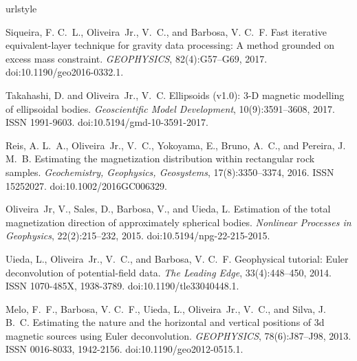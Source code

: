 
\nocite{*}

%
\begin{thebibliography}{9}
\providecommand{\natexlab}[1]{#1}
\expandafter\ifx\csname urlstyle\endcsname\relax
  \providecommand{\doi}[1]{doi:\discretionary{}{}{}#1}\else
  \providecommand{\doi}{doi:\discretionary{}{}{}\begingroup
  \urlstyle{rm}\Url}\fi

Siqueira, F. C.~L., Oliveira~Jr., V.~C., and Barbosa, V. C.~F.
\newblock Fast iterative equivalent-layer technique for gravity data
  processing: {A} method grounded on excess mass constraint.
\newblock \emph{GEOPHYSICS}, 82(4):G57--G69, 2017.
\newblock \doi{10.1190/geo2016-0332.1}.

Takahashi, D. and Oliveira~Jr., V.~C.
\newblock Ellipsoids (v1.0): 3-{D} magnetic modelling of ellipsoidal bodies.
\newblock \emph{Geoscientific Model Development}, 10(9):3591--3608, 2017.
\newblock ISSN 1991-9603.
\newblock \doi{10.5194/gmd-10-3591-2017}.

Reis, A. L.~A., Oliveira~Jr., V.~C., Yokoyama, E., Bruno, A.~C., and Pereira,
  J. M.~B.
\newblock Estimating the magnetization distribution within rectangular rock
  samples.
\newblock \emph{Geochemistry, Geophysics, Geosystems}, 17(8):3350--3374, 2016.
\newblock ISSN 15252027.
\newblock \doi{10.1002/2016GC006329}.

Oliveira~Jr, V., Sales, D., Barbosa, V., and Uieda, L.
\newblock Estimation of the total magnetization direction of approximately
  spherical bodies.
\newblock \emph{Nonlinear Processes in Geophysics}, 22(2):215--232, 2015.
\newblock \doi{10.5194/npg-22-215-2015}.

Uieda, L., Oliveira~Jr., V.~C., and Barbosa, V. C.~F.
\newblock Geophysical tutorial: {Euler} deconvolution of potential-field data.
\newblock \emph{The Leading Edge}, 33(4):448--450, 2014.
\newblock ISSN 1070-485X, 1938-3789.
\newblock \doi{10.1190/tle33040448.1}.

Melo, F.~F., Barbosa, V. C.~F., Uieda, L., Oliveira~Jr., V.~C., and Silva, J.
  B.~C.
\newblock Estimating the nature and the horizontal and vertical positions of 3d
  magnetic sources using {Euler} deconvolution.
\newblock \emph{GEOPHYSICS}, 78(6):J87--J98, 2013.
\newblock ISSN 0016-8033, 1942-2156.
\newblock \doi{10.1190/geo2012-0515.1}.


\end{thebibliography}
